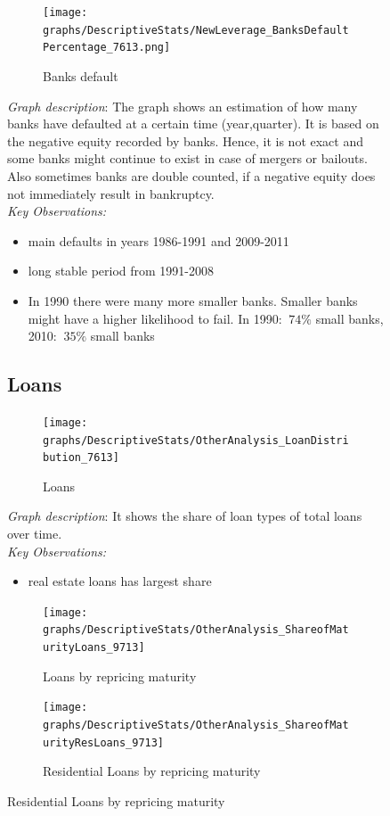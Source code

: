 \documentclass[12pt, a4paper]{article} %
\begin{document}
\begin{figure}[hbtp]
\newpage


\begin{figure}[hbtp]
\centering
\caption{Banks default}
\texttt{[image: graphs/DescriptiveStats/NewLeverage\_BanksDefaultPercentage\_7613.png]}
\end{figure}

\noindent \textit{Graph description}: The graph shows an estimation of how many banks have defaulted at a certain time (year,quarter). It is based on the negative equity recorded by banks. Hence, it is not exact and some banks might continue to exist in case of mergers or bailouts. Also sometimes banks are double counted, if a negative equity does not immediately result in bankruptcy. \\
\noindent \textit{Key Observations:}
\begin{itemize}
\item main defaults in years 1986-1991 and 2009-2011
\item long stable period from 1991-2008
\item In 1990 there were many more smaller banks. Smaller banks might have a higher likelihood to fail. In 1990:  $~74\%$ small banks, 2010: $~35\%$ small banks 
\end{itemize}


\subsection{Loans}

\begin{figure}[hbtp]
\centering
\caption{Loans}
\texttt{[image: graphs/DescriptiveStats/OtherAnalysis\_LoanDistribution\_7613]}
\end{figure}

\noindent \textit{Graph description}: It shows the share of loan types of total loans over time.\\

\noindent \textit{Key Observations:}
\begin{itemize}
\item real estate loans has largest share

\end{itemize}

\begin{figure}[hbtp]
\centering
\caption{Loans by repricing maturity}
\texttt{[image: graphs/DescriptiveStats/OtherAnalysis\_ShareofMaturityLoans\_9713]}
\end{figure}


\begin{figure}[hbtp]
\centering
\caption{Residential Loans by repricing maturity}
\texttt{[image: graphs/DescriptiveStats/OtherAnalysis\_ShareofMaturityResLoans\_9713]}
\end{figure}


\end{figure}
\end{document}
